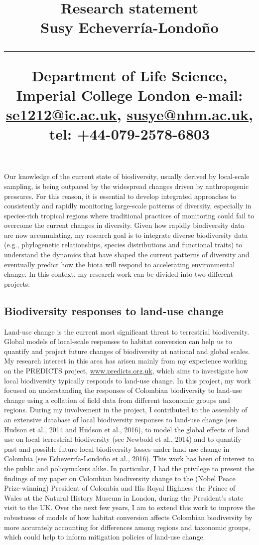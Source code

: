 \documentclass[svgnames,11pt,longbibliography,reqno]{article}
\title{%
          \vspace{-2\baselineskip}
              \normalsize
              \large Research statement\\
              {\Large \textbf{Susy Echeverr\'ia-Londo\~no}}\\
              \vspace{0.5\baselineskip}
              \hrule
              \vspace{0.5\baselineskip}
              Department of Life Science, Imperial College London
              e-mail: \href{mailto:se1212@ic.ac.uk}{se1212@ic.ac.uk},
              \href{mailto:susye@nhm.ac.uk}{susye@nhm.ac.uk},
              tel: +44-079-2578-6803
          \vspace{-1.5ex}
          }
\date{}
\author{}
\begin{document}
\maketitle
\vspace{-2\baselineskip}

Our knowledge of the current state of biodiversity, usually derived by local-scale sampling, is being outpaced by the widespread changes driven by anthropogenic pressures. For this reason, it is essential to develop integrated approaches to consistently and rapidly monitoring large-scale patterns of diversity, especially in species-rich tropical regions where traditional practices of monitoring could fail to overcome the current changes in diversity. Given how rapidly biodiversity data are now accumulating, my research goal is to integrate diverse biodiversity data (e.g., phylogenetic relationships, species distributions and functional traits) to understand the dynamics that have shaped the current patterns of diversity and eventually predict how the biota will respond to accelerating environmental change. In this context, my research work can be divided into two different projects: 

\subsection*{Biodiversity responses to land-use change}

Land-use change is the current most significant threat to terrestrial biodiversity. Global models of local-scale responses to habitat conversion can help us to quantify and project future changes of biodiversity at national and global scales. My research interest in this area has arisen mainly from my experience working on the PREDICTS project,  \href{http://www.predicts.org.uk/}{www.predicts.org.uk}, which aims to investigate how local biodiversity typically responds to land-use change. In this project, my work focused on understanding the responses of Colombian biodiversity to land-use change using a collation of field data from different taxonomic groups and regions. During my involvement in the project, I contributed to the assembly of an extensive database of local biodiversity responses to land-use change (see Hudson et al., 2014 and Hudson et al., 2016), to model the global effects of land use on local terrestrial biodiversity (see Newbold et al., 2014) and to quantify past and possible future local biodiversity losses under land-use change in Colombia (see Echeverr\'ia-Londo\~no et al., 2016). This work has been of interest to the public and policymakers alike. In particular, I had the privilege to present the findings of my paper on Colombian biodiversity change to the (Nobel Peace Prize-winning) President of Colombia and His Royal Highness the Prince of Wales at the Natural History Museum in London, during the President's state visit to the UK. Over the next few years, I am to extend this work to improve the robustness of models of how habitat conversion affects Colombian biodiversity by more accurately accounting for differences among regions and taxonomic groups, which could help to inform mitigation policies of land-use change.  
\end{document}

